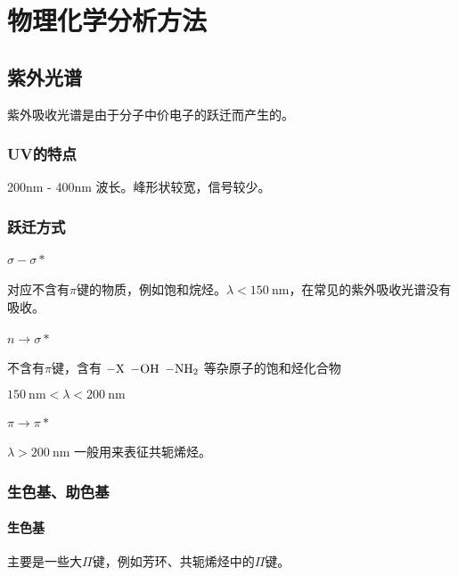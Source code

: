 \chapter{物理化学分析方法}

\section{紫外光谱}

紫外吸收光谱是由于分子中价电子的跃迁而产生的。

\subsection{UV的特点}

200nm - 400nm 波长。峰形状较宽，信号较少。

\subsection{跃迁方式}

\subsubsection{$\sigma - \sigma*$}

对应不含有$\pi$键的物质，例如饱和烷烃。$\lambda < 150 \ \mathrm{nm}$，在常见的紫外吸收光谱没有吸收。

\subsubsection{$n \rightarrow \sigma*$}

不含有$\pi$键，含有 $\ce{-X}$ $\ce{-OH}$ $\ce{-NH2}$ 等杂原子的饱和烃化合物

$150 \ \mathrm{nm} < \lambda < 200 \ \mathrm{nm}$

\subsubsection{$\pi \rightarrow \pi*$}

$\lambda > 200 \ \mathrm{nm}$ 一般用来表征共轭烯烃。

\subsection{生色基、助色基}

\subsubsection{生色基}
主要是一些大$\Pi$键，例如芳环、共轭烯烃中的$\Pi$键。
